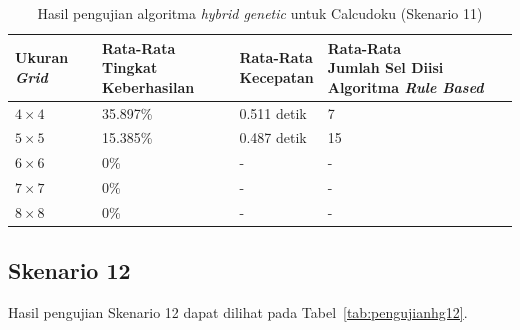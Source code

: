 \begin{table}
\centering
\captionsetup{justification=centering}
\caption[Hasil pengujian algoritma \textit{hybrid genetic} untuk Calcudoku (Skenario 11)]{Hasil pengujian algoritma \textit{hybrid genetic} untuk Calcudoku (Skenario 11)}
\begin{tabular}{| l | l | l | l |}
\hline
Ukuran \textit{Grid} & \makecell[l]{Rata-Rata \\ Tingkat Keberhasilan} & \makecell[l]{Rata-Rata \\ Kecepatan} & \makecell[l]{Rata-Rata \\ Jumlah Sel Diisi Algoritma \textit{Rule Based}} \\
\hline \hline
\begin{math}4 \times 4\end{math} & 35.897\% & 0.511 detik & 7 \\
\hline
\begin{math}5 \times 5\end{math} & 15.385\% & 0.487 detik & 15 \\
\hline
\begin{math}6 \times 6\end{math} & 0\% & - & - \\
\hline
\begin{math}7 \times 7\end{math} & 0\% & - & - \\
\hline
\begin{math}8 \times 8\end{math} & 0\% & - & - \\
\hline
\end{tabular}
\label{tab:pengujianhg11}
\end{table}

\subsection{Skenario 12}
\label{sec:skenario12}

Hasil pengujian Skenario 12 dapat dilihat pada Tabel~\ref{tab:pengujianhg12}.

